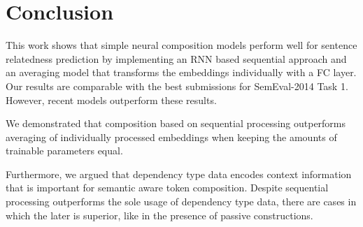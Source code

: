










\section{Conclusion}

This work shows that simple neural composition models perform well for sentence relatedness prediction by implementing an \ac{RNN} based sequential approach and an averaging model that transforms the embeddings individually with a \ac{FC} layer. Our results are comparable with the best submissions for SemEval-2014 Task 1. However, recent models outperform these results.

We demonstrated that composition based on sequential processing outperforms averaging of individually processed embeddings when keeping the amounts of trainable parameters equal. 

Furthermore, we argued that dependency type data encodes context information that is important for semantic aware token composition. Despite sequential processing outperforms the sole usage of dependency type data, there are cases in which the later is superior, like in the presence of passive constructions. %

